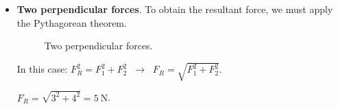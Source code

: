 \begin{itemize}
\begin{figure}[H]
        \caption{Two forces with opposite sense.}
    \end{figure}
    In this case, we have:
    \( \Sigma F_R = F_1 + F_2 = \qty{3}{\newton} - \qty{2}{\newton} = \qty{1}{\newton} \).
    Since \( F_2 \) goes in the opposite direction, we assign it the negative sign.

    \item \textbf{Two perpendicular forces}.
    To obtain the resultant force, we must apply the Pythagorean theorem.
    \begin{figure}[H]
        \centering
        \caption{Two perpendicular forces.}
        \label{fig:two_perpendicular_forces}
    \end{figure}
    In this case:
    \( F_R^2 = F_1^2 + F_2^2 \;\;\longrightarrow\;\; F_R = \sqrt{F_1^2 + F_2^2} \).

    \( F_R = \sqrt{3^2 + 4^2} = \qty{5}{\newton} \).
\end{itemize}


